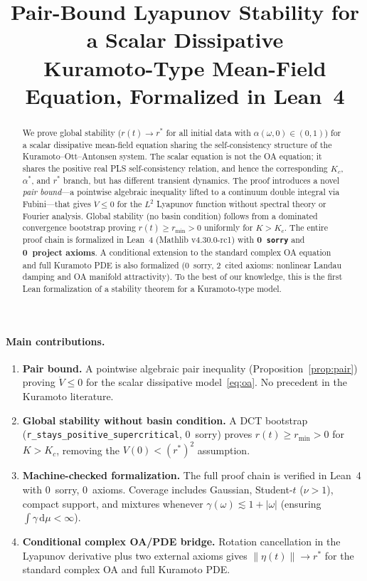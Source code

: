 \documentclass[11pt,a4paper]{article}
\title{Pair-Bound Lyapunov Stability for a Scalar Dissipative\\
Kuramoto-Type Mean-Field Equation, Formalized in Lean~4}
\author{}
\date{}
\theoremstyle{definition}
\begin{document}
\maketitle

\begin{abstract}
We prove global stability ($r(t) \to r^*$ for all initial data with $\alpha(\omega,0) \in (0,1)$) for a scalar dissipative mean-field equation sharing the self-consistency structure of the Kuramoto--Ott--Antonsen system. The scalar equation is not the OA equation; it shares the positive real PLS self-consistency relation, and hence the corresponding $K_c$, $\alpha^*$, and $r^*$ branch, but has different transient dynamics. The proof introduces a novel \emph{pair bound}---a pointwise algebraic inequality lifted to a continuum double integral via Fubini---that gives $\dot V \leq 0$ for the $L^2$ Lyapunov function without spectral theory or Fourier analysis. Global stability (no basin condition) follows from a dominated convergence bootstrap proving $r(t) \geq r_{\min} > 0$ uniformly for $K > K_c$. The entire proof chain is formalized in Lean~4 (Mathlib v4.30.0-rc1) with \textbf{0~\texttt{sorry}} and \textbf{0~project axioms}. A conditional extension to the standard complex OA equation and full Kuramoto PDE is also formalized (0~sorry, 2~cited axioms: nonlinear Landau damping and OA manifold attractivity). To the best of our knowledge, this is the first Lean formalization of a stability theorem for a Kuramoto-type model.
\end{abstract}

\paragraph{Main contributions.}
\begin{enumerate}[label=(\arabic*)]
\item \textbf{Pair bound.} A pointwise algebraic pair inequality (Proposition~\ref{prop:pair}) proving $\dot V \leq 0$ for the scalar dissipative model~\eqref{eq:oa}. No precedent in the Kuramoto literature.
\item \textbf{Global stability without basin condition.} A DCT bootstrap (\texttt{r\_stays\_positive\_supercritical}, 0~sorry) proves $r(t) \geq r_{\min} > 0$ for $K > K_c$, removing the $V(0) < (r^*)^2$ assumption.
\item \textbf{Machine-checked formalization.} The full proof chain is verified in Lean~4 with 0~sorry, 0~axioms. Coverage includes Gaussian, Student-$t$ ($\nu > 1$), compact support, and mixtures whenever $\gamma(\omega) \lesssim 1 + |\omega|$ (ensuring $\int\gamma\,\mathrm{d}\mu < \infty$).
\item \textbf{Conditional complex OA/PDE bridge.} Rotation cancellation in the Lyapunov derivative plus two external axioms gives $\|\eta(t)\| \to r^*$ for the standard complex OA and full Kuramoto PDE.
\end{enumerate}
\end{document}
